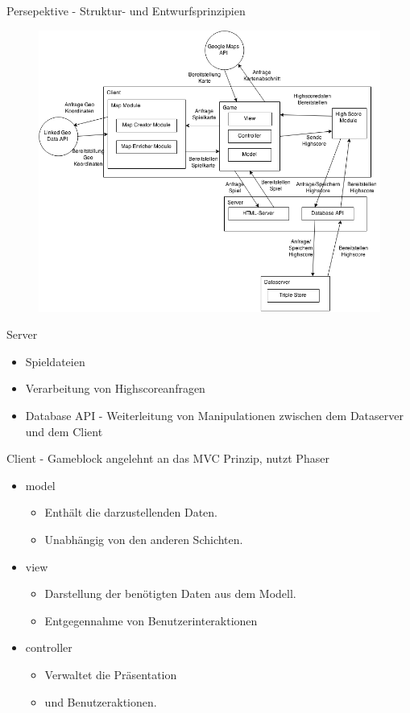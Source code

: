\documentclass{beamer}
\begin{document}
\begin{frame}{Persepektive - Struktur- und
Entwurfsprinzipien}
\begin{figure}[htb]
  \centering
  \includegraphics[scale=0.34]{6.png}
  \label{PNFs}
\end{figure} 
\end{frame}
\begin{frame}{Server}
\begin{itemize}
\item Spieldateien
\item  Verarbeitung von Highscoreanfragen 
\item Database API - Weiterleitung von Manipulationen zwischen dem Dataserver und dem Client  
\end{itemize}
\end{frame}
\begin{frame}{Client - Gameblock}
angelehnt an das MVC Prinzip, nutzt Phaser \par\bigskip

\begin{itemize}
\item model
\begin{itemize}
\item Enthält die darzustellenden Daten.
\item Unabhängig von den anderen Schichten.
\end{itemize}
\item view
\begin{itemize}
\item Darstellung der benötigten
Daten aus dem Modell.
\item Entgegennahme von Benutzerinteraktionen 
\end{itemize}

\item controller
\begin{itemize}
\item Verwaltet die Präsentation
\item und Benutzeraktionen.
\end{itemize}

\end{itemize}
\end{frame}
\end{document}
